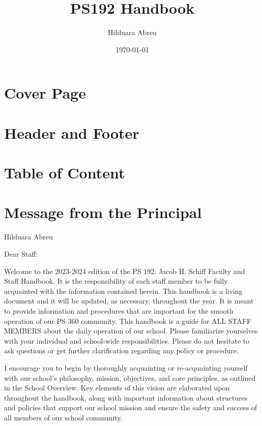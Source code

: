 \documentclass[letterpaper, 11pt]{article}
\author{Hilduara Abreu}
\date{\today}
\title{PS192 Handbook}
\begin{document}
\maketitle
\tableofcontents


\section{Cover Page}
\label{sec:orgbb2125d}
\thispagestyle{empty}


\section{Header and Footer}
\label{sec:org1d3ab46}
\pagenumbering{\fancyhf{}}
\pagestyle{headings}
\fancyhead[L]{\textit{\rightmark}}
\fancyhead[R]{\thepage}
\pagestyle{fancy}
\renewcommand{\footrulewidth}{1px}

\section{Table of Content}
\label{sec:org96ae8a6}
\setcounter{tocdepth}{2}
\tableofcontents

\section{Message from the Principal}
\label{sec:orgb15848b}
Hilduara Abreu

Dear Staff:

Welcome to the 2023-2024 edition of the PS 192: Jacob H. Schiff Faculty and Staff Handbook. It is the responsibility of each staff member to be fully acquainted with the information contained herein. This handbook is a living document and it will be updated, as necessary, throughout the year. It is meant to provide information and procedures that are important for the smooth operation of our PS 360 community. This handbook is a guide for ALL STAFF MEMBERS about the daily operation of our school. Please familiarize yourselves with your individual and school-wide responsibilities. Please do not hesitate to ask questions or get further clarification regarding any policy or procedure.

I encourage you to begin by thoroughly acquainting or re-acquainting yourself with our school’s philosophy, mission, objectives, and core principles, as outlined in the School Overview. Key elements of this vision are elaborated upon throughout the handbook, along with important information about structures and policies that support our school mission and ensure the safety and success of all members of our school community.
\end{document}
